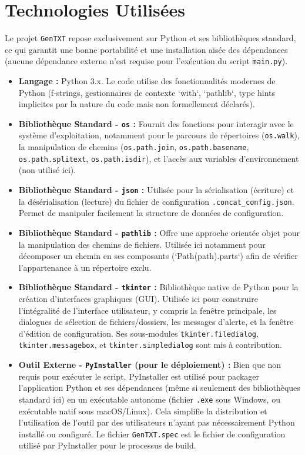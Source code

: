 \documentclass[11pt, a4paper]{article}
\begin{document}
\section{Technologies Utilisées}

Le projet \texttt{GenTXT} repose exclusivement sur Python et ses bibliothèques standard, ce qui garantit une bonne portabilité et une installation aisée des dépendances (aucune dépendance externe n'est requise pour l'exécution du script \texttt{main.py}).

\begin{itemize}
    \item \textbf{Langage :} Python 3.x. Le code utilise des fonctionnalités modernes de Python (f-strings, gestionnaires de contexte `with`, `pathlib`, type hints implicites par la nature du code mais non formellement déclarés).
    \item \textbf{Bibliothèque Standard - \texttt{os} :} Fournit des fonctions pour interagir avec le système d'exploitation, notamment pour le parcours de répertoires (\texttt{os.walk}), la manipulation de chemins (\texttt{os.path.join}, \texttt{os.path.basename}, \texttt{os.path.splitext}, \texttt{os.path.isdir}), et l'accès aux variables d'environnement (non utilisé ici).
    \item \textbf{Bibliothèque Standard - \texttt{json} :} Utilisée pour la sérialisation (écriture) et la désérialisation (lecture) du fichier de configuration \texttt{.concat\_config.json}. Permet de manipuler facilement la structure de données de configuration.
    \item \textbf{Bibliothèque Standard - \texttt{pathlib} :} Offre une approche orientée objet pour la manipulation des chemins de fichiers. Utilisée ici notamment pour décomposer un chemin en ses composants (`Path(path).parts`) afin de vérifier l'appartenance à un répertoire exclu.
    \item \textbf{Bibliothèque Standard - \texttt{tkinter} :} Bibliothèque native de Python pour la création d'interfaces graphiques (GUI). Utilisée ici pour construire l'intégralité de l'interface utilisateur, y compris la fenêtre principale, les dialogues de sélection de fichiers/dossiers, les messages d'alerte, et la fenêtre d'édition de configuration. Ses sous-modules \texttt{tkinter.filedialog}, \texttt{tkinter.messagebox}, et \texttt{tkinter.simpledialog} sont mis à contribution.
    \item \textbf{Outil Externe - \texttt{PyInstaller} (pour le déploiement) :} Bien que non requis pour exécuter le script, PyInstaller est utilisé pour packager l'application Python et ses dépendances (même si seulement des bibliothèques standard ici) en un exécutable autonome (fichier \texttt{.exe} sous Windows, ou exécutable natif sous macOS/Linux). Cela simplifie la distribution et l'utilisation de l'outil par des utilisateurs n'ayant pas nécessairement Python installé ou configuré. Le fichier \texttt{GenTXT.spec} est le fichier de configuration utilisé par PyInstaller pour le processus de build.
\end{itemize}
\end{document}
